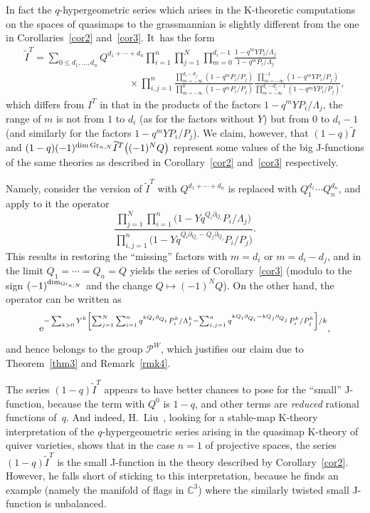 \documentclass[10pt,a4paper]{amsart}
\numberwithin{equation}{section}
\def\CC{\mathbb C}
\def\tilde{\widetilde}
\def\p{\partial}
\theoremstyle{definition}
\theoremstyle{plain}
\begin{document}
In fact the $q$-hypergeometric series which arises in the K-theoretic computations on the spaces of quasimaps to the grassmannian is slightly different from the one in Corollaries~\ref{cor2} and~\ref{cor3}. It~has the form
\begin{gather*}
\tilde{I}^T = \sum_{0\leq d_1,\dots,d_n}Q^{d_1+\cdots+d_n} \prod_{i=1}^n\prod_{j=1}^N\prod_{m=0}^{d_i-1}\frac{1-q^mYP_i/\Lambda_j} {1-q^mP_i/\Lambda_j}
\\ \phantom{\tilde{I}^T =\sum_{0\leq d_1,\dots,d_n}Q^{d_1+\cdots}}
{}\times \prod_{i,j=1}^n\frac{\prod_{m=-\infty}^{d_i-d_j}(1-q^mP_i/P_j)}{\prod_{m=-\infty}^0(1-q^mP_i/P_j)}\frac{\prod_{m=-\infty}^{-1}(1-q^mY P_i/P_j)}{\prod_{m=-\infty}^{d_i-d_j-1}(1-q^mY P_i/P_j)},
\end{gather*}
which differs from $I^T$ in that in the products of the factors $1-q^mYP_i/\Lambda_j$, the range of $m$ is not from $1$ to $d_i$ (as for the factors without $Y$) but from $0$ to $d_i-1$ (and similarly for the factors $1-q^mYP_i/P_j$). We claim, however, that $(1-q) \tilde{I}$ and $(1-q) (-1)^{\dim {\rm Gr}_{n,N}} \tilde{I}^T\big((-1)^NQ\big)$ represent some values of the big J-functions of the same theories as described in Corollary~\ref{cor2} and~\ref{cor3} respectively.

Namely, consider the version of $\tilde{I}^T$ with $Q^{d_1+\cdots+d_n}$ is replaced with $Q_1^{d_1}\cdots Q_n^{d_n}$, and apply to it the operator
\[
\frac{\prod_{j=1}^N\prod_{i=1}^n\big(1-Y q^{Q_i\p_{Q_i}}P_i/\Lambda_j\big)}{\prod_{i,j=1}^n\big(1-Y q^{Q_i\p_{Q_i}-Q_j\p_{Q_j}}P_i/P_j\big)}.
\]
This results in restoring the ``missing'' factors with $m=d_i$ or $m=d_i-d_j$, and in the limit $Q_1=\cdots=Q_n=Q$ yields the series of Corollary~\ref{cor3} (modulo to the sign $(-1)^{\dim_{{\rm Gr}_{n,N}}}$ and the change $Q\mapsto (-1)^NQ$). On the other hand, the operator can be written as
\[
{\rm e}^{-\sum_{k>0} Y^k \left[\sum_{j=1}^N\sum_{i=1}^n q^{kQ_i\p_{Q_i}}P^k_i/\Lambda^k_j - \sum_{i,j=1}^n q^{kQ_i\p_{Q_i}-kQ_j\p_{Q_j}} P^k_i/P^k_j \right]/k},
\]
and hence belongs to the group ${\mathcal P}^W$, which justifies our claim due to Theorem~\ref{thm3} and Remark~\ref{rmk4}.

The series $(1-q)\tilde{I}^T$ appears to have better chances to pose for the ``small'' J-function, because the term with $Q^0$ is $1-q$, and other terms are {\em reduced} rational functions of~$q$. And indeed, H.~Liu~\cite{Liu}, looking for a stable-map K-theory interpretation of the $q$-hypergeometric series arising in the quasimap K-theory of quiver varieties, shows that in the case $n=1$ of projective spaces, the series $(1-q)\tilde{I}^T$ is the small J-function in the theory described by Corollary~\ref{cor2}. However, he falls short of sticking to this interpretation, because he finds an example (namely the manifold of flags in $\CC^3$) where the similarly twisted small J-function is unbalanced.
\end{document}
